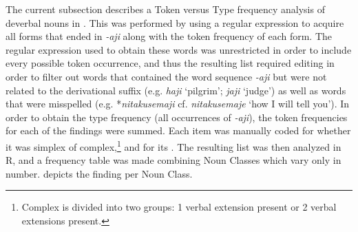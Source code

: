 \documentclass[output=paper,modfonts]{langscibook}
\begin{document}
The current subsection describes a Token versus Type frequency analysis of  deverbal nouns in . This was performed by using a regular expression to acquire all forms that ended in \textit{-aji} along with the token frequency of each form. The regular expression used to obtain these words was unrestricted in order to include every possible token occurrence, and thus the resulting list required editing in order to filter out words that contained the word sequence \textit{-aji} but were not related to the derivational suffix (e.g. \textit{haji} ‘pilgrim’; \textit{jaji} ‘judge’) as well as words that were misspelled (e.g. *\textit{nitakusemaji} cf. \textit{nitakusemaje} ‘how I will tell you’). In order to obtain the type frequency (all occurrences of \textit{-aji}), the token frequencies for each of the findings were summed. Each item was manually coded for whether it was simplex of complex,{}\footnote{Complex is divided into two groups: 1 verbal extension present or 2 verbal extensions present.} and for its . The resulting list was then analyzed in R, and a frequency table was made combining Noun Classes which vary only in number.  depicts the finding per Noun Class.
\end{document}
